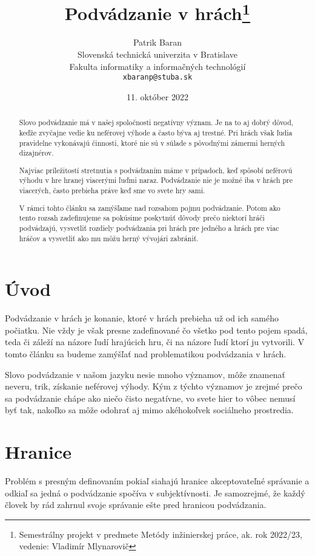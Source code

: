 \documentclass[10pt,twoside,slovak,a4paper]{article}
\title{Podvádzanie v hrách\thanks{Semestrálny projekt v predmete Metódy inžinierskej práce, ak. rok 2022/23, vedenie: Vladimír Mlynarovič}} %
\author{Patrik Baran\\[2pt]
	{\small Slovenská technická univerzita v Bratislave}\\
	{\small Fakulta informatiky a informačných technológií}\\
	{\small \texttt{xbaranp@stuba.sk}}
	}
\date{\small 11. október 2022} %
\begin{document}
\maketitle

\begin{abstract}
Slovo podvádzanie má v našej spoločnosti negatívny význam. Je na to aj dobrý dôvod, keďže zvyčajne vedie ku neférovej výhode a často býva aj trestné. Pri hrách však ľudia pravidelne vykonávajú činnosti, ktoré nie sú v súlade s pôvodnými zámermi herných dizajnérov.

Najviac príležitostí stretnutia s podvádzaním máme v prípadoch, keď spôsobí neférovú výhodu v hre hranej viacerými ľuďmi naraz. Podvádzanie nie je možné iba v hrách pre viacerých, často prebieha práve keď sme vo svete hry sami.

V rámci tohto článku sa zamýšľame nad rozsahom pojmu podvádzanie. Potom ako tento rozsah zadefinujeme sa pokúsime poskytnúť dôvody prečo niektorí hráči podvádzajú, vysvetliť rozdiely podvádzania pri hrách pre jedného a hrách pre viac hráčov a vysvetliť ako mu môžu herný vývojári zabrániť.
\end{abstract}

\newpage


\section{Úvod}

Podvádzanie v hrách je konanie, ktoré v hrách prebieha už od ich samého počiatku. Nie vždy je však presne zadefinované čo všetko pod tento pojem spadá, teda či záleží na názore ľudí hrajúcich hru, či na názore ľudí ktorí ju vytvorili. V tomto článku sa budeme zamýšľať nad problematikou podvádzania v hrách.

Slovo podvádzanie v našom jazyku nesie mnoho významov, môže znamenať neveru, trik, získanie neférovej výhody. Kým z týchto významov je zrejmé prečo sa podvádzanie chápe ako niečo čisto negatívne, vo svete hier to vôbec nemusí byť tak, nakoľko sa môže odohrať aj mimo akéhokoľvek sociálneho prostredia.

\section{Hranice}

Problém s presným definovaním pokiaľ siahajú hranice akceptovateľné správanie a odkiaľ sa jedná o podvádzanie spočíva v subjektívnosti. Je samozrejmé, že každý človek by rád zahrnul svoje správanie ešte pred hranicou podvádzania. %
\end{document}
